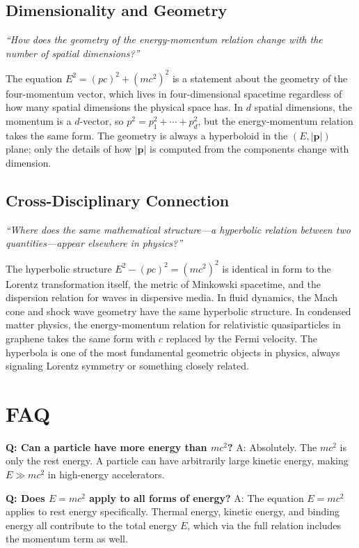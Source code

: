 \subsection*{Dimensionality and Geometry}
\textit{``How does the geometry of the energy-momentum relation change with the number of spatial dimensions?''}

The equation $E^2 = (pc)^2 + (mc^2)^2$ is a statement about the geometry of the four-momentum vector, which lives in four-dimensional spacetime regardless of how many spatial dimensions the physical space has. In $d$ spatial dimensions, the momentum is a $d$-vector, so $p^2 = p_1^2 + \cdots + p_d^2$, but the energy-momentum relation takes the same form. The geometry is always a hyperboloid in the $(E, |\mathbf{p}|)$ plane; only the details of how $|\mathbf{p}|$ is computed from the components change with dimension.

\subsection*{Cross-Disciplinary Connection}
\textit{``Where does the same mathematical structure---a hyperbolic relation between two quantities---appear elsewhere in physics?''}

The hyperbolic structure $E^2 - (pc)^2 = (mc^2)^2$ is identical in form to the Lorentz transformation itself, the metric of Minkowski spacetime, and the dispersion relation for waves in dispersive media. In fluid dynamics, the Mach cone and shock wave geometry have the same hyperbolic structure. In condensed matter physics, the energy-momentum relation for relativistic quasiparticles in graphene takes the same form with $c$ replaced by the Fermi velocity. The hyperbola is one of the most fundamental geometric objects in physics, always signaling Lorentz symmetry or something closely related.

\section*{FAQ}

\textbf{Q: Can a particle have more energy than $mc^2$?}
A: Absolutely. The $mc^2$ is only the rest energy. A particle can have arbitrarily large kinetic energy, making $E \gg mc^2$ in high-energy accelerators.

\textbf{Q: Does $E = mc^2$ apply to all forms of energy?}
A: The equation $E = mc^2$ applies to rest energy specifically. Thermal energy, kinetic energy, and binding energy all contribute to the total energy $E$, which via the full relation includes the momentum term as well.

